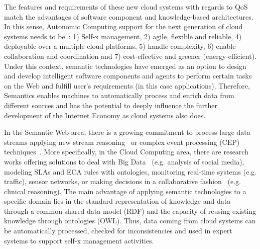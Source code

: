 The features and requirements of these new cloud systems with regards to QoS~\cite{Pedersen:2011:AMQ:2114495.2115542}
match the advantages of software component and knowledge-based architectures. In 
this sense, Autonomic Computing support for the next generation of cloud systems 
needs to be~\cite{Conejero:2012:MSQ:2357487.2357591,Pedersen:2011:AMQ:2114495.2115542}: 
1) Self-x management, 2) agile, flexible and reliable, 4) deployable over a multiple cloud platforms, 5) handle complexity, 6) enable 
collaboration and coordination and 7) cost-effective and greener 
(energy-efficient). Under this context, semantic technologies have emerged as an 
option to design and develop intelligent software components and agents to 
perform certain tasks on the Web and fulfill user’s requirements (in this case 
applications). Therefore, Semantics enables machines to automatically process 
and enrich data from different sources and has the potential to deeply influence 
the further development of the Internet Economy as cloud systems also does.

In the Semantic Web area, there is a growing commitment to process large data streams applying new stream reasoning~\cite{Bolles:2008:SSE:1789394.1789438,Barbieri:2010:EEC:1739041.1739095} 
or complex event processing (CEP) techniques~\cite{Anicic:2011:EUL:1963405.1963495}. More specifically, in the Cloud Computing area, there are research works offering 
solutions to deal with Big Data~\cite{Fan:2013:MBD:2481244.2481246} (e.g. analysis of social media), modeling SLAs and ECA rules with ontologies, 
monitoring real-time systems (e.g. traffic), sensor networks, or making decisions in a collaborative fashion~\cite{RodriGuez-GonzaLez:2012:UAP:2350799.2350907} (e.g. clinical reasoning). 
The main advantage of applying semantic technologies to a specific domain lies in the standard representation of knowledge and data through a common-shared data model (RDF) and the 
capacity of reusing existing knowledge through ontologies (OWL). Thus, data coming from cloud systems can be automatically processed, checked for inconsistencies and 
used in expert systems to support self-x management activities.


